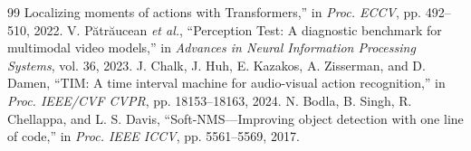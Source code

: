 \documentclass[journal,10pt]{IEEEtran}
\begin{document}
\begin{thebibliography}{99}
Localizing moments of actions with Transformers,'' in \emph{Proc. ECCV},
pp. 492--510, 2022.
 V. P\u{a}tr\u{a}ucean \emph{et al.},
``Perception Test: A diagnostic benchmark for multimodal video models,''
in \emph{Advances in Neural Information Processing Systems}, vol. 36, 2023.
 J. Chalk, J. Huh, E. Kazakos, A. Zisserman, and D. Damen,
``TIM: A time interval machine for audio-visual action recognition,''
in \emph{Proc. IEEE/CVF CVPR}, pp. 18153--18163, 2024.
 N. Bodla, B. Singh, R. Chellappa, and L. S. Davis,
``Soft-NMS---Improving object detection with one line of code,'' in
\emph{Proc. IEEE ICCV}, pp. 5561--5569, 2017.
\end{thebibliography}
\end{document}
